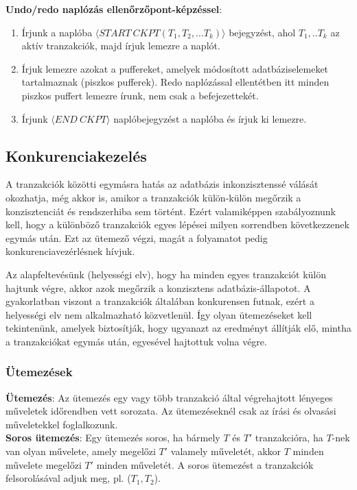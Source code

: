 \documentclass[margin=0px]{article}
\begin{document}
	
	\noindent \textbf{Undo/redo naplózás ellenőrzőpont-képzéssel}:
	\begin{enumerate}
		\item	Írjunk a naplóba $\langle START \ CKPT(T_{1},T_{2},...T_{k}) \rangle$ bejegyzést, ahol $T_{1},..T_{k}$ az aktív
		tranzakciók, majd írjuk lemezre a naplót.
		
		\item	Írjuk lemezre azokat a puffereket, amelyek módosított adatbáziselemeket tartalmaznak (piszkos pufferek). Redo naplózással
		ellentétben itt minden piszkos puffert lemezre írunk, nem csak a befejezettekét.
		
		\item	Írjunk $\langle END \ CKPT \rangle$ naplóbejegyzést a naplóba és írjuk ki lemezre.
	\end{enumerate}

	\subsection{Konkurenciakezelés}
	
	A tranzakciók közötti egymásra hatás az adatbázis inkonzisztenssé válását okozhatja, még akkor is, amikor a tranzakciók külön-külön
	megőrzik a konzisztenciát és rendszerhiba sem történt. Ezért valamiképpen szabályoznunk kell, hogy a különböző tranzakciók egyes
	lépései milyen sorrendben következzenek egymás után. Ezt az ütemező végzi, magát a folyamatot pedig konkurenciavezérlésnek hívjuk.
	
	Az alapfeltevésünk (helyességi elv), hogy ha minden egyes tranzakciót külön hajtunk végre, akkor azok megőrzik a konzisztens
	adatbázis-állapotot. A gyakorlatban viszont a tranzakciók általában konkurensen futnak, ezért a helyességi elv nem
	alkalmazható közvetlenül. Így olyan ütemezéseket kell tekintenünk, amelyek biztosítják, hogy ugyanazt az eredményt állítják elő,
	mintha a tranzakciókat egymás után, egyesével hajtottuk volna végre.
	
	\subsubsection{Ütemezések}
	
	\noindent \textbf{Ütemezés}: Az ütemezés egy vagy több tranzakció által végrehajtott lényeges műveletek időrendben vett
	sorozata. Az ütemezéseknél csak	az írási és olvasási műveletekkel foglalkozunk.\\
	
	\noindent \textbf{Soros ütemezés}: Egy ütemezés soros, ha bármely $T$ és $T'$ tranzakcióra, ha $T$-nek van olyan művelete, amely
	megelőzi $T'$ valamely műveletét, akkor $T$ minden művelete megelőzi $T'$ minden műveletét. A soros ütemezést a tranzakciók
	felsorolásával adjuk meg, pl. ($T_{1},T_{2}$).\\
	
\end{document}
